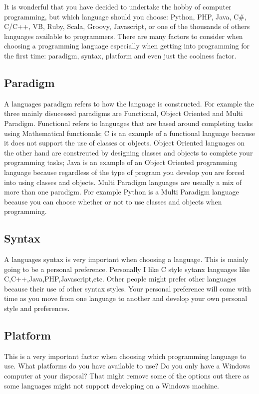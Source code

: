 It is wonderful that you have decided to undertake the hobby of computer programming, but which language should you choose: Python, PHP, Java, C\#,
C/C++, VB, Ruby, Scala, Groovy, Javascript, or one of the thousands of others languages available to programmers. There are many factors to consider
when choosing a programming language especially when getting into programming for the first time: paradigm, syntax, platform and even just the
coolness factor.

\subsection{Paradigm}
A languages paradigm refers to how the language is constructed. For example the three mainly disucessed paradigms are Functional, Object Oriented
and Multi Paradigm. Functional refers to languages that are based around completing tasks using Mathematical functionals; C is an example of
a functional language because it does not support the use of classes or objects. Object Oriented languages on the other hand are constrcuted
by designing classes and objects to complete your programming tasks; Java is an example of an Object Oriented programming language because
regardless of the type of program you develop you are forced into using classes and objects. Multi Paradigm languages are usually a mix
of more than one paradigm. For example Python is a Multi Paradigm language because you can choose whether or not to use classes and objects
when programming.

\subsection{Syntax}
A languages syntax is very important when choosing a language. This is mainly going to be a personal preference. Personally I like C style
sytanx languages like C,C++,Java,PHP,Javascript,etc. Other people might prefer other languages because their use of other syntax styles. Your
personal preference will come with time as you move from one language to another and develop your own personal style and preferences.

\subsection{Platform}
This is a very important factor when choosing which programming language to use. What platforms do you have available to use? Do you only have
a Windows computer at your disposal? That might remove some of the options out there as some languages might not support developing on a 
Windows machine.

